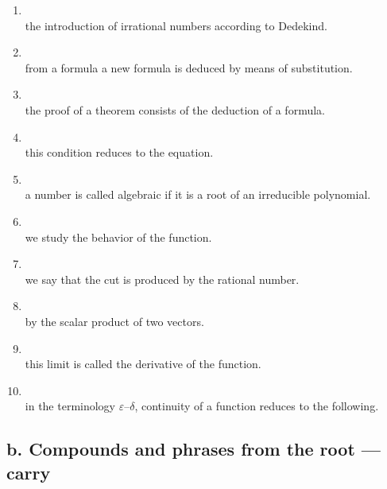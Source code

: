 \begin{enumerate}[label=\arabic*)]
\item {}\\
      the introduction of irrational numbers according to Dedekind.
\item {}\\
      from a formula a new formula is deduced by means of substitution.
\item {}\\
      the proof of a theorem consists of the deduction of a formula.
\item {}\\
      this condition reduces to the equation.
\item {}\\
      a number is called algebraic if it is a root of an irreducible polynomial.
\item {}\\
      we study the behavior of the function.
\item {}\\
      we say that the cut is produced by the rational number.
\item {}\\
      by the scalar product of two vectors.
\item {}\\
      this limit is called the derivative of the function.
\item {}\\
      in the terminology $\varepsilon$--$\delta$, continuity of a function reduces to the following.
\end{enumerate}

\subsection*{b. Compounds and phrases from the root  --- carry}

